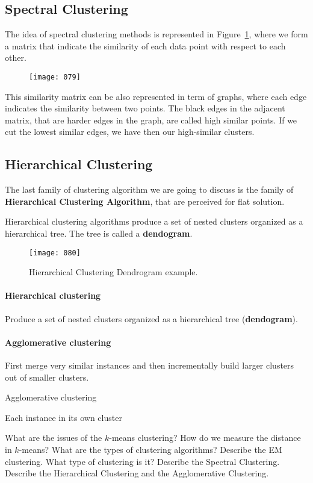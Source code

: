 \subsection{Spectral Clustering}
The idea of spectral clustering methods is represented in Figure~\ref{fig:079}, where we form a matrix that indicate the similarity of each data point with respect to each other.

\begin{figure}[h!]
    \centering
    \texttt{[image: 079]}
    \caption{}
    \label{fig:079}
\end{figure}

This similarity matrix can be also represented in term of graphs, where each edge indicates the similarity between two points. The black edges in the adjacent matrix, that are harder edges in the graph, are called high similar points. If we cut the lowest similar edges, we have then our high-similar clusters.

\subsection{Hierarchical Clustering}
The last family of clustering algorithm we are going to discuss is the family of \textbf{Hierarchical Clustering Algorithm}, that are perceived for flat solution. 

Hierarchical clustering algorithms produce a set of nested clusters organized as a hierarchical tree. The tree is called a \textbf{dendogram}.

\begin{figure}[h!]
    \centering
    \texttt{[image: 080]}
    \caption{Hierarchical Clustering Dendrogram example.}
    \label{fig:080}
\end{figure}

\paragraph{Hierarchical clustering}
Produce a set of nested clusters organized as a hierarchical tree (\textbf{dendogram}).
\paragraph{Agglomerative clustering} First merge very similar instances and then incrementally build larger clusters out of smaller clusters.
\begin{algorithm}
    \caption{Agglomerative clustering}
    Each instance in its own cluster\;
\end{algorithm}

\newpage
\begin{exercise}
    \ex What are the issues of the \(k\)-means clustering?
    \ex How do we measure the distance in \(k\)-means?
    \ex What are the types of clustering algorithms?
    \ex Describe the EM clustering. What type of clustering is it?
    \ex Describe the Spectral Clustering.
    \ex Describe the Hierarchical Clustering and the Agglomerative Clustering.
\end{exercise}